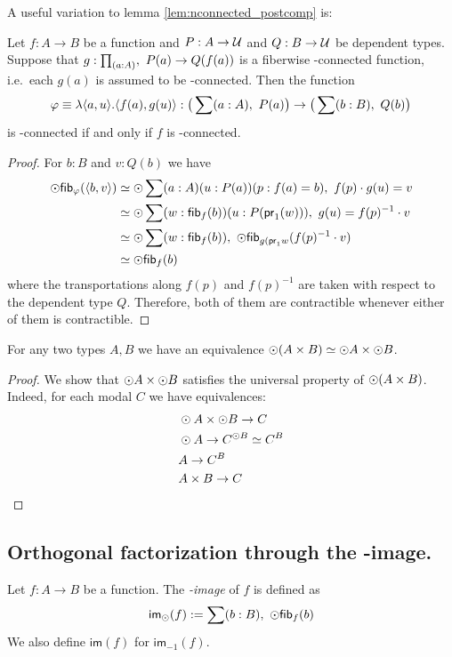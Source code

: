 A useful variation to lemma \ref{lem:nconnected_postcomp} is:
\begin{lem}\label{lem:nconnected_postcomp_variation}
Let $f:A\to B$ be a function and $P:A\to\mathcal{U}$ and $Q:B\to\mathcal{U}$ be dependent types. Suppose that $g:\prd{a:A},\ P(a)\to Q(f(a))$
is a fiberwise \modal-connected function, i.e.\ each $g(a)$ is assumed to be \modal-connected. Then the function
\begin{equation*}
\varphi\equiv\lambda\pairr{a,u}.\pairr{f(a),g(u)}:\big(\sum(a:A),\ P(a)\big)\to\big(\sum(b:B),\ Q(b)\big)
\end{equation*}
is \modal-connected if and only if $f$ is \modal-connected.
\end{lem}

\begin{proof}
For $b:B$ and $v:Q(b)$ we have
\begin{align*}
\odot\mathsf{fib}_{\varphi}({\langle b,v\rangle}) & \simeq \odot\sum(a:A)(u:P(a))(p:f(a)= b),\ f(p)\cdot g(u)= v\\
& \simeq \odot\sum(w:\mathsf{fib}_{f}(b))(u:P(\mathsf{pr}_{1}(w))),\ g(u)= f(p)^{-1}\cdot v\\
& \simeq \odot\sum(w:\mathsf{fib}_{f}(b)),\ \odot\mathsf{fib}_{g(\mathsf{pr}_{1} w}(f(p)^{-1}\cdot v)\\
& \simeq \odot\mathsf{fib}_{f}(b)
\end{align*}
where the transportations along $f(p)$ and $f(p)^{-1}$ are taken with respect to the dependent type $Q$. Therefore, both of them are
contractible whenever either of them is contractible.
\end{proof}

\begin{lem}\label{cor:trunc_prod}
For any two types $A,B$ we have an equivalence $\odot (A\times B) \simeq
\odot A \times \odot B$.
\end{lem}
\begin{proof}
 We show that $\odot A \times \odot B$ satisfies the universal property of $\odot (A\times B)$.
 Indeed, for each modal $C$ we have equivalences:
 \begin{align*}
&\odot A \times \odot B \to C\\
&\odot A \to C^{\odot B}\simeq C^B\\
&A\to C^B\\
&A\times B \to C
 \end{align*}
\end{proof}

\subsection{Orthogonal factorization through the \modal-image.}\label{sec:image_factorization}
\begin{defn}\label{def:modal_image}
Let $f:A\to B$ be a function. The \emph{\modal-image} of $f$ is defined as
\begin{equation*}
\im_\modal(f):=\sum(b:B),\ \modal\hfib{f}b
\end{equation*}
We also define $\mathsf{im}(f)$ for $\mathsf{im}_{-1}(f)$. 
\end{defn}



